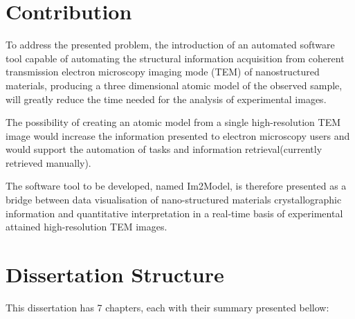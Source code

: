 \documentclass[
  oneside,
  11pt, a4paper,
  footinclude=true,
  headinclude=true,
  cleardoublepage=empty
]{scrbook}
\begin{document}
	\section{Contribution}
	
	To address the presented problem, the introduction of an automated software tool capable of automating the structural information acquisition from coherent transmission electron microscopy imaging mode (TEM) of nanostructured materials, producing a three dimensional atomic model of the observed sample, will greatly reduce the time needed for the analysis of experimental images.\par 
	
	The possibility of creating an atomic model from a single high-resolution TEM image would increase the information presented to electron microscopy users and would support the automation of tasks and information retrieval(currently retrieved manually).\par 
	
	The software tool to be developed, named Im2Model, is therefore presented as a bridge between data visualisation of nano-structured materials crystallographic information and quantitative interpretation in a real-time basis of experimental attained high-resolution TEM images.\par 
		\section{Dissertation Structure}
		

This dissertation has 7 chapters, each with their summary presented bellow:
\end{document}
